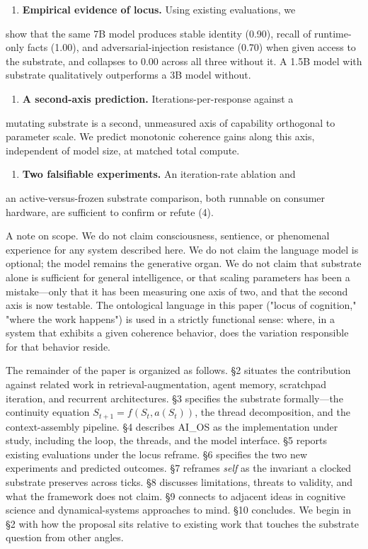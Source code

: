 \documentclass[11pt,letterpaper]{article}
\begin{document}
\begin{enumerate}
  \item \textbf{Empirical evidence of locus.} Using existing evaluations, we
\end{enumerate}
   show that the same 7B model produces stable identity (0.90),
   recall of runtime-only facts (1.00), and adversarial-injection
   resistance (0.70) when given access to the substrate, and
   collapses to 0.00 across all three without it. A 1.5B model
   with substrate qualitatively outperforms a 3B model without.

\begin{enumerate}
  \item \textbf{A second-axis prediction.} Iterations-per-response against a
\end{enumerate}
   mutating substrate is a second, unmeasured axis of capability
   orthogonal to parameter scale. We predict monotonic coherence
   gains along this axis, independent of model size, at matched
   total compute.

\begin{enumerate}
  \item \textbf{Two falsifiable experiments.} An iteration-rate ablation and
\end{enumerate}
   an active-versus-frozen substrate comparison, both runnable on
   consumer hardware, are sufficient to confirm or refute (4).

A note on scope. We do not claim consciousness, sentience, or
phenomenal experience for any system described here. We do not
claim the language model is optional; the model remains the
generative organ. We do not claim that substrate alone is
sufficient for general intelligence, or that scaling parameters has
been a mistake---only that it has been measuring one axis of two,
and that the second axis is now testable. The ontological language
in this paper ("locus of cognition," "where the work happens") is
used in a strictly functional sense: where, in a system that
exhibits a given coherence behavior, does the variation
responsible for that behavior reside.

The remainder of the paper is organized as follows. §2 situates
the contribution against related work in retrieval-augmentation,
agent memory, scratchpad iteration, and recurrent architectures.
§3 specifies the substrate formally---the continuity equation
$S_{t+1} = f(S_t, a(S_t))$, the thread decomposition, and the
context-assembly pipeline. §4 describes AI\_OS as the implementation
under study, including the loop, the threads, and the model
interface. §5 reports existing evaluations under the locus
reframe. §6 specifies the two new experiments and predicted
outcomes. §7 reframes \emph{self} as the invariant a clocked substrate
preserves across ticks. §8 discusses limitations, threats to
validity, and what the framework does not claim. §9 connects to
adjacent ideas in cognitive science and dynamical-systems
approaches to mind. §10 concludes. We begin in §2 with how the
proposal sits relative to existing work that touches the substrate
question from other angles.
\end{document}
